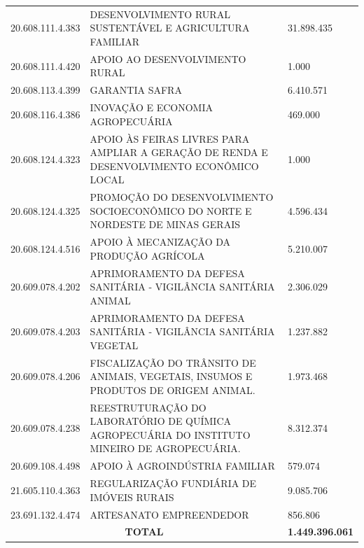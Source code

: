 \documentclass{article}
\begin{document}
\begin{longtable}[c]{m{3cm}|m{12cm}|m{2cm}}
\multicolumn{1}{C{3cm}|}{20.608.111.4.383} & \multicolumn{1}{L{12cm}|}{DESENVOLVIMENTO RURAL SUSTENTÁVEL E AGRICULTURA FAMILIAR} & \multicolumn{1}{R{2cm}}{31.898.435} \\
\multicolumn{1}{C{3cm}|}{20.608.111.4.420} & \multicolumn{1}{L{12cm}|}{APOIO AO DESENVOLVIMENTO RURAL} & \multicolumn{1}{R{2cm}}{1.000} \\
\multicolumn{1}{C{3cm}|}{20.608.113.4.399} & \multicolumn{1}{L{12cm}|}{GARANTIA SAFRA} & \multicolumn{1}{R{2cm}}{6.410.571} \\
\multicolumn{1}{C{3cm}|}{20.608.116.4.386} & \multicolumn{1}{L{12cm}|}{INOVAÇÃO E ECONOMIA AGROPECUÁRIA} & \multicolumn{1}{R{2cm}}{469.000} \\
\multicolumn{1}{C{3cm}|}{20.608.124.4.323} & \multicolumn{1}{L{12cm}|}{APOIO ÀS FEIRAS LIVRES PARA AMPLIAR A GERAÇÃO DE RENDA E DESENVOLVIMENTO ECONÔMICO LOCAL} & \multicolumn{1}{R{2cm}}{1.000} \\
\multicolumn{1}{C{3cm}|}{20.608.124.4.325} & \multicolumn{1}{L{12cm}|}{PROMOÇÃO DO DESENVOLVIMENTO SOCIOECONÔMICO DO NORTE E NORDESTE DE MINAS GERAIS} & \multicolumn{1}{R{2cm}}{4.596.434} \\
\multicolumn{1}{C{3cm}|}{20.608.124.4.516} & \multicolumn{1}{L{12cm}|}{APOIO À MECANIZAÇÃO DA PRODUÇÃO AGRÍCOLA} & \multicolumn{1}{R{2cm}}{5.210.007} \\
\multicolumn{1}{C{3cm}|}{20.609.078.4.202} & \multicolumn{1}{L{12cm}|}{APRIMORAMENTO DA DEFESA SANITÁRIA - VIGILÂNCIA SANITÁRIA ANIMAL} & \multicolumn{1}{R{2cm}}{2.306.029} \\
\multicolumn{1}{C{3cm}|}{20.609.078.4.203} & \multicolumn{1}{L{12cm}|}{APRIMORAMENTO DA DEFESA SANITÁRIA - VIGILÂNCIA SANITÁRIA VEGETAL} & \multicolumn{1}{R{2cm}}{1.237.882} \\
\multicolumn{1}{C{3cm}|}{20.609.078.4.206} & \multicolumn{1}{L{12cm}|}{FISCALIZAÇÃO DO TRÂNSITO DE ANIMAIS, VEGETAIS, INSUMOS E PRODUTOS DE ORIGEM ANIMAL.} & \multicolumn{1}{R{2cm}}{1.973.468} \\
\multicolumn{1}{C{3cm}|}{20.609.078.4.238} & \multicolumn{1}{L{12cm}|}{REESTRUTURAÇÃO DO LABORATÓRIO DE QUÍMICA AGROPECUÁRIA DO INSTITUTO MINEIRO DE AGROPECUÁRIA.} & \multicolumn{1}{R{2cm}}{8.312.374} \\
\multicolumn{1}{C{3cm}|}{20.609.108.4.498} & \multicolumn{1}{L{12cm}|}{APOIO À AGROINDÚSTRIA FAMILIAR} & \multicolumn{1}{R{2cm}}{579.074} \\
\multicolumn{1}{C{3cm}|}{21.605.110.4.363} & \multicolumn{1}{L{12cm}|}{REGULARIZAÇÃO FUNDIÁRIA DE IMÓVEIS RURAIS} & \multicolumn{1}{R{2cm}}{9.085.706} \\
\multicolumn{1}{C{3cm}|}{23.691.132.4.474} & \multicolumn{1}{L{12cm}|}{ARTESANATO EMPREENDEDOR} & \multicolumn{1}{R{2cm}}{856.806} \\
\hline\hline
\multicolumn{2}{c|}{ \textbf{TOTAL}} & \multicolumn{1}{R{2cm}}{ \textbf{1.449.396.061}} \\\hline\hline\end{longtable}
\end{document}
